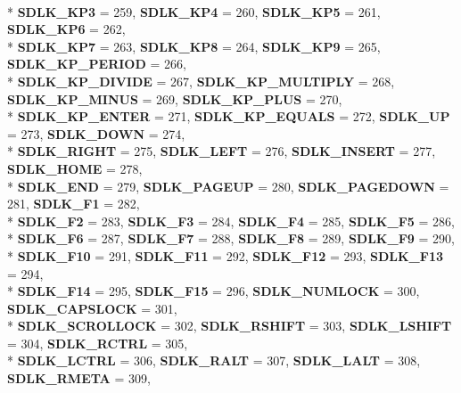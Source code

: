 \begin{DoxyCompactItemize}
\\*
{\bf S\+D\+L\+K\+\_\+\+K\+P3} = 259, 
{\bf S\+D\+L\+K\+\_\+\+K\+P4} = 260, 
{\bf S\+D\+L\+K\+\_\+\+K\+P5} = 261, 
{\bf S\+D\+L\+K\+\_\+\+K\+P6} = 262, 
\\*
{\bf S\+D\+L\+K\+\_\+\+K\+P7} = 263, 
{\bf S\+D\+L\+K\+\_\+\+K\+P8} = 264, 
{\bf S\+D\+L\+K\+\_\+\+K\+P9} = 265, 
{\bf S\+D\+L\+K\+\_\+\+K\+P\+\_\+\+P\+E\+R\+I\+O\+D} = 266, 
\\*
{\bf S\+D\+L\+K\+\_\+\+K\+P\+\_\+\+D\+I\+V\+I\+D\+E} = 267, 
{\bf S\+D\+L\+K\+\_\+\+K\+P\+\_\+\+M\+U\+L\+T\+I\+P\+L\+Y} = 268, 
{\bf S\+D\+L\+K\+\_\+\+K\+P\+\_\+\+M\+I\+N\+U\+S} = 269, 
{\bf S\+D\+L\+K\+\_\+\+K\+P\+\_\+\+P\+L\+U\+S} = 270, 
\\*
{\bf S\+D\+L\+K\+\_\+\+K\+P\+\_\+\+E\+N\+T\+E\+R} = 271, 
{\bf S\+D\+L\+K\+\_\+\+K\+P\+\_\+\+E\+Q\+U\+A\+L\+S} = 272, 
{\bf S\+D\+L\+K\+\_\+\+U\+P} = 273, 
{\bf S\+D\+L\+K\+\_\+\+D\+O\+W\+N} = 274, 
\\*
{\bf S\+D\+L\+K\+\_\+\+R\+I\+G\+H\+T} = 275, 
{\bf S\+D\+L\+K\+\_\+\+L\+E\+F\+T} = 276, 
{\bf S\+D\+L\+K\+\_\+\+I\+N\+S\+E\+R\+T} = 277, 
{\bf S\+D\+L\+K\+\_\+\+H\+O\+M\+E} = 278, 
\\*
{\bf S\+D\+L\+K\+\_\+\+E\+N\+D} = 279, 
{\bf S\+D\+L\+K\+\_\+\+P\+A\+G\+E\+U\+P} = 280, 
{\bf S\+D\+L\+K\+\_\+\+P\+A\+G\+E\+D\+O\+W\+N} = 281, 
{\bf S\+D\+L\+K\+\_\+\+F1} = 282, 
\\*
{\bf S\+D\+L\+K\+\_\+\+F2} = 283, 
{\bf S\+D\+L\+K\+\_\+\+F3} = 284, 
{\bf S\+D\+L\+K\+\_\+\+F4} = 285, 
{\bf S\+D\+L\+K\+\_\+\+F5} = 286, 
\\*
{\bf S\+D\+L\+K\+\_\+\+F6} = 287, 
{\bf S\+D\+L\+K\+\_\+\+F7} = 288, 
{\bf S\+D\+L\+K\+\_\+\+F8} = 289, 
{\bf S\+D\+L\+K\+\_\+\+F9} = 290, 
\\*
{\bf S\+D\+L\+K\+\_\+\+F10} = 291, 
{\bf S\+D\+L\+K\+\_\+\+F11} = 292, 
{\bf S\+D\+L\+K\+\_\+\+F12} = 293, 
{\bf S\+D\+L\+K\+\_\+\+F13} = 294, 
\\*
{\bf S\+D\+L\+K\+\_\+\+F14} = 295, 
{\bf S\+D\+L\+K\+\_\+\+F15} = 296, 
{\bf S\+D\+L\+K\+\_\+\+N\+U\+M\+L\+O\+C\+K} = 300, 
{\bf S\+D\+L\+K\+\_\+\+C\+A\+P\+S\+L\+O\+C\+K} = 301, 
\\*
{\bf S\+D\+L\+K\+\_\+\+S\+C\+R\+O\+L\+L\+O\+C\+K} = 302, 
{\bf S\+D\+L\+K\+\_\+\+R\+S\+H\+I\+F\+T} = 303, 
{\bf S\+D\+L\+K\+\_\+\+L\+S\+H\+I\+F\+T} = 304, 
{\bf S\+D\+L\+K\+\_\+\+R\+C\+T\+R\+L} = 305, 
\\*
{\bf S\+D\+L\+K\+\_\+\+L\+C\+T\+R\+L} = 306, 
{\bf S\+D\+L\+K\+\_\+\+R\+A\+L\+T} = 307, 
{\bf S\+D\+L\+K\+\_\+\+L\+A\+L\+T} = 308, 
{\bf S\+D\+L\+K\+\_\+\+R\+M\+E\+T\+A} = 309, 

\end{DoxyCompactItemize}
